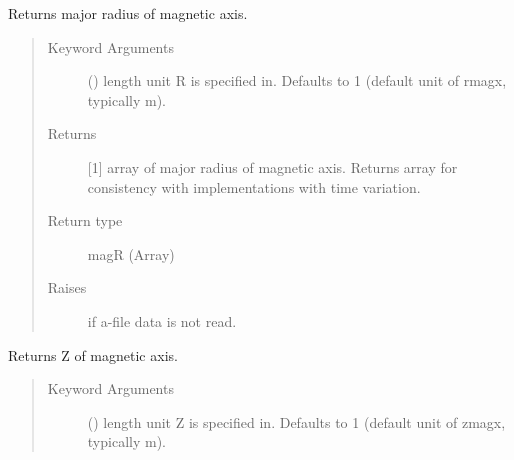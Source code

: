 \documentclass[letterpaper,10pt,english]{sphinxmanual}
\begin{document}
\begin{fulllineitems}
\begin{fulllineitems}
\begin{quote}
\begin{description}
\end{description}\end{quote}

\end{fulllineitems}


\begin{fulllineitems}
\label{\detokenize{eqtools:eqtools.eqdskreader.EqdskReader.getMagR}}
Returns major radius of magnetic axis.
\begin{quote}\begin{description}
\item[{Keyword Arguments}] \leavevmode
{} () \textendash{} length unit R is specified in.  Defaults
to 1 (default unit of rmagx, typically m).

\item[{Returns}] \leavevmode
{[}1{]} array of major radius of magnetic axis.  Returns
array for consistency with
{\hyperref[\detokenize{eqtools:eqtools.core.Equilibrium}]{}}
implementations with time variation.

\item[{Return type}] \leavevmode
magR (Array)

\item[{Raises}] \leavevmode
{} \textendash{} if a-file data is not read.

\end{description}\end{quote}

\end{fulllineitems}


\begin{fulllineitems}
\label{\detokenize{eqtools:eqtools.eqdskreader.EqdskReader.getMagZ}}
Returns Z of magnetic axis.
\begin{quote}\begin{description}
\item[{Keyword Arguments}] \leavevmode
{} () \textendash{} length unit Z is specified in.  Defaults
to 1 (default unit of zmagx, typically m).


\end{description}
\end{quote}
\end{fulllineitems}
\end{fulllineitems}
\end{document}
